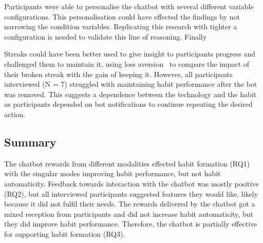 Participants were able to personalise the chatbot with several different variable configurations. This personalisation could have effected the findings by not narrowing the condition variables. Replicating this research with tighter a configuration is needed to validate this line of reasoning. Finally

Streaks could have been better used to give insight to participants progress and challenged them to maintain it, using loss aversion~\cite{loss_aversion} to compare the impact of their broken streak with the gain of keeping it. However, all participants interviewed (N = 7) struggled with maintaining habit performance after the bot was removed. This suggests a dependence between the technology and the habit as participants depended on bot notifications to continue repeating the desired action.


\subsection*{Summary}
The chatbot rewards from different modalities effected habit formation (RQ1) with the singular modes improving habit performance, but not habit automaticity. Feedback towards interaction with the chatbot was mostly positive (RQ2), but all interviewed participants suggested features they would like, likely because it did not fulfil their needs. The rewards delivered by the chatbot got a mixed reception from participants and did not increase habit automaticity, but they did improve habit performance. Therefore, the chatbot is partially effective for supporting habit formation (RQ3).
